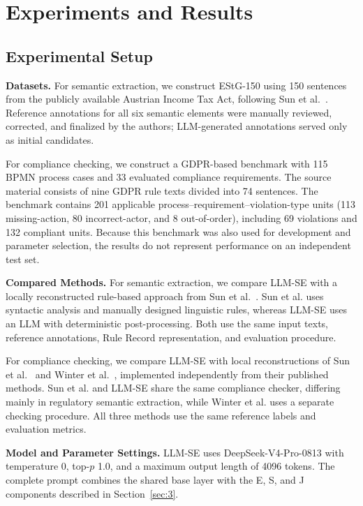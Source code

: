 \documentclass[conference]{IEEEtran}
\begin{document}
\section{Experiments and Results}
\label{sec:4}

\subsection{Experimental Setup}
\label{sec:4.1}

\textbf{Datasets.}
For semantic extraction, we construct EStG-150 using 150 sentences from the publicly available Austrian Income Tax Act, following Sun et al.~\cite{sun2024design}. Reference annotations for all six semantic elements were manually reviewed, corrected, and finalized by the authors; LLM-generated annotations served only as initial candidates.

For compliance checking, we construct a GDPR-based benchmark with 115 BPMN process cases and 33 evaluated compliance requirements. The source material consists of nine GDPR rule texts divided into 74 sentences. The benchmark contains 201 applicable process--requirement--violation-type units (113 missing-action, 80 incorrect-actor, and 8 out-of-order), including 69 violations and 132 compliant units. Because this benchmark was also used for development and parameter selection, the results do not represent performance on an independent test set.

\textbf{Compared Methods.}
For semantic extraction, we compare LLM-SE with a locally reconstructed rule-based approach from Sun et al.~\cite{sun2024design}. Sun et al. uses syntactic analysis and manually designed linguistic rules, whereas LLM-SE uses an LLM with deterministic post-processing. Both use the same input texts, reference annotations, Rule Record representation, and evaluation procedure.

For compliance checking, we compare LLM-SE with local reconstructions of Sun et al.~\cite{sun2024design} and Winter et al.~\cite{winter2020assessing}, implemented independently from their published methods. Sun et al. and LLM-SE share the same compliance checker, differing mainly in regulatory semantic extraction, while Winter et al. uses a separate checking procedure. All three methods use the same reference labels and evaluation metrics.

\textbf{Model and Parameter Settings.}
LLM-SE uses DeepSeek-V4-Pro-0813 with temperature 0, top-$p$ 1.0, and a maximum output length of 4096 tokens. The complete prompt combines the shared base layer with the E, S, and J components described in Section~\ref{sec:3}.
\end{document}
